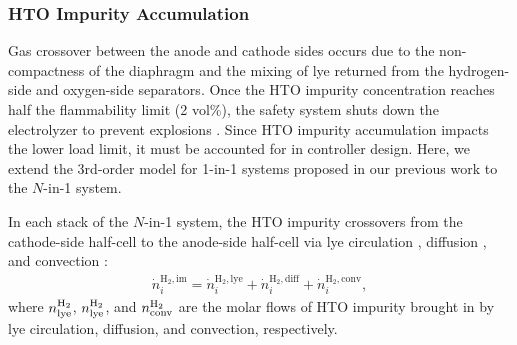 \documentclass[review,3p,10pt]{elsarticle}
\begin{document}
\subsubsection{HTO Impurity Accumulation}
\label{sec:hto}

Gas crossover between the anode and cathode sides occurs due to the non-compactness of the diaphragm and the mixing of lye returned from the hydrogen-side and oxygen-side separators. %
Once the HTO impurity concentration reaches half the flammability limit (2 vol\%), the safety system shuts down the electrolyzer to prevent explosions \cite{sanchez2018semi}. Since HTO impurity accumulation impacts the lower load limit, it must be accounted for in controller design.
Here, we extend the 3rd-order model for 1-in-1 systems proposed in our previous work \cite{qi2021pressure} to the $N$-in-1 system.

In each stack of the $N$-in-1 system, the HTO impurity crossovers from the cathode-side half-cell to the anode-side half-cell via lye circulation \cite{david2020dynamic}, diffusion \cite{trinke2018hydrogen}, and convection \cite{trinke2018hydrogen}:
\begin{align}
  \dot{n}^{\text{H}_2,\text{im}}_i = \dot{n}^{\text{H}_2,\text{lye}}_i +  \dot{n}^{\text{H}_2,\text{diff}}_i +  \dot{n}^{\text{H}_2,\text{conv}}_i  , \label{eq:nim}
\end{align}
\noindent
where $n^{\rm{H_2}}_{\rm{lye}}$, $n^{\rm{H_2}}_{\rm{lye}}$, and $n^{\rm{H_2}}_{\rm{conv}}$ are the molar flows of HTO impurity brought in by lye circulation, diffusion, and convection, respectively. %
\end{document}
